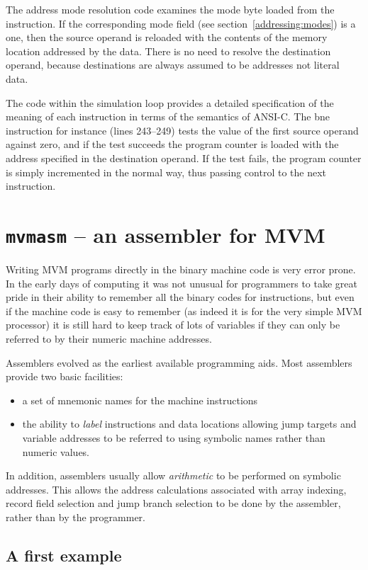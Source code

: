 The address mode resolution code examines the mode byte loaded from the
instruction. If the corresponding mode field (see
section~\ref{addressing:modes}) is a one, then the source operand is
reloaded with the contents of the memory location addressed by the data.
There is no need to resolve the destination operand, because
destinations are always assumed to be addresses not literal data.

The code within the simulation loop provides a detailed specification of
the meaning of each instruction in terms of the semantics of ANSI-C. The
{\sc bne} instruction for instance (lines 243--249) tests the value of
the first source operand against zero, and if the test succeeds the
program counter is loaded with the address specified in the destination
operand. If the test fails, the program counter is simply incremented in
the normal way, thus passing control to the next instruction.

\chapter{{\tt mvmasm} -- an assembler for MVM}
\label{mvmasm}
Writing MVM programs directly in the binary machine code is  very
error prone. In the early days of computing it was not unusual for
programmers to take great pride in their ability to remember all the
binary codes for instructions, but even if the machine code is easy to
remember (as indeed it is for the very simple MVM processor) it is still
hard to keep track of lots of variables if they can only be referred to
by their numeric machine addresses. 

Assemblers evolved as the earliest available programming aids. Most
assemblers provide two basic facilities:
\begin{itemize}
\item a set of mnemonic names for the machine instructions
\item the ability to {\em label} instructions and data locations 
allowing jump targets and variable addresses to be referred to using symbolic names
rather than numeric values.
\end{itemize}

In addition, assemblers usually allow {\em arithmetic} to be performed on symbolic
addresses. This allows the address calculations associated with array indexing, record 
field selection and jump branch selection to be done by the assembler, rather than
by the programmer.

\section{A first example}

